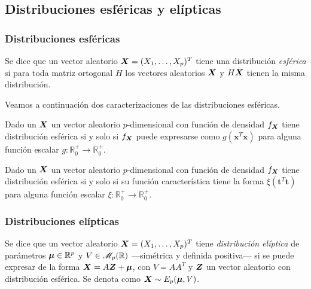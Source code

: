 \subsection{Distribuciones esféricas y elípticas}

\subsubsection{Distribuciones esféricas}

\begin{ndef}
  Se dice que un vector aleatorio $\boldsymbol{X} = (X_1, \dots, X_p)^T$ tiene una distribución \textit{esférica} si para toda matriz ortogonal $H$ los vectores aleatorios $\boldsymbol{X}$ y $H\boldsymbol{X}$ tienen la misma distribución.
\end{ndef}

Veamos a continuación dos caracterizaciones de las distribuciones esféricas.

\begin{nprop}
  Dado un $\boldsymbol{X}$ un vector aleatorio $p$-dimensional con función de densidad $f_{\boldsymbol{X}}$ tiene distribución esférica si y solo si $f_{\boldsymbol{X}}$ puede expresarse como $g(\boldsymbol x^T \boldsymbol x)$ para alguna función escalar $g : \mathbb R_0^+ \to \mathbb R_0^+$.
\end{nprop}

\begin{nprop}
  Dado un $\boldsymbol{X}$ un vector aleatorio $p$-dimensional con función de densidad $f_{\boldsymbol{X}}$ tiene distribución esférica si y solo si su función característica tiene la forma $\xi(\boldsymbol t^T \boldsymbol t)$ para alguna función escalar $\xi: \mathbb R_0^+ \to \mathbb R_0^+$.
\end{nprop}

\subsubsection{Distribuciones elípticas}

\begin{ndef}
  Se dice que un vector aleatorio $\boldsymbol{X} = (X_1, \dots, X_p)^T$ tiene \textit{distribución elíptica} de parámetros $\boldsymbol \mu\in\mathbb{R}^p$ y $V\in\mathscr{M}_p(\mathbb{R})$ —simétrica y definida positiva— si se puede expresar de la forma $\boldsymbol{X} = A\boldsymbol{Z} + \boldsymbol \mu$, con $V = AA^T$ y $\boldsymbol{Z}$ un vector aleatorio con distribución esférica. Se denota como $\boldsymbol{X} \sim E_p(\boldsymbol \mu, V)$.
\end{ndef}

